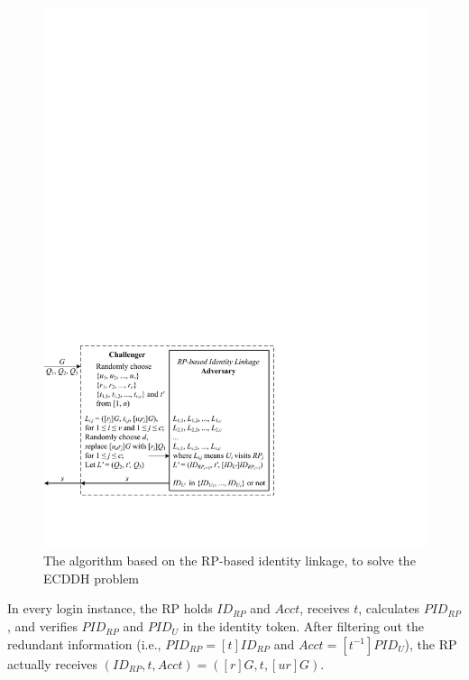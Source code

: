 \begin{figure}[tb]
  \centering
  \includegraphics[width=0.96\linewidth]{fig/dalgorithm.pdf}
  \caption{The algorithm based on the RP-based identity linkage, to solve the ECDDH problem}
  \label{fig:dalgorithm}
\end{figure}


In every login instance,
    the RP holds $ID_{RP}$ and $Acct$, receives $t$, calculates $PID_{RP}$,
    and verifies $PID_{RP}$ and $PID_U$ in the identity token.
After filtering out the redundant information (i.e., $PID_{RP}= [t]{ID_{RP}}$ and $Acct = [t^{-1}]PID_{U}$),
    the RP actually receives $(ID_{RP}, t, Acct) = ([r]G, t, [ur]G)$.

